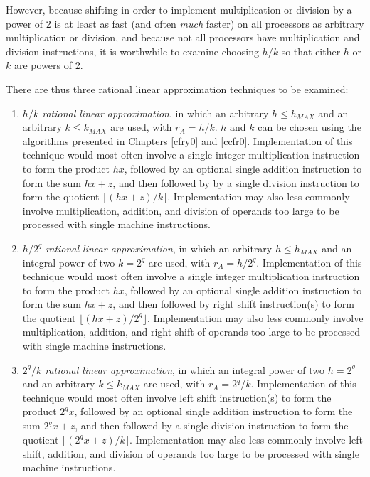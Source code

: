 However, because shifting in order
to implement multiplication or division by a power of 2 
is at least as fast (and often \emph{much} faster)
on all processors as arbitrary multiplication or division, 
and because not all processors have multiplication and division instructions,
it is worthwhile to examine choosing $h/k$ so that either $h$ or $k$ are 
powers of 2.

There are thus three rational linear approximation techniques to be
examined:

\begin{enumerate}
\item \emph{$h/k$ rational linear approximation}, in which an arbitrary
      $h \leq h_{MAX}$ and an arbitrary $k \leq k_{MAX}$ are used,
	  with $r_A = h/k$.  $h$ and $k$ can be chosen using the algorithms
	  presented in Chapters \cfryzeroxrefhyphen\ref{cfry0} and \ccfrzeroxrefhyphen\ref{ccfr0}.
	  Implementation of this technique would most often involve a single integer
	  multiplication instruction to form the product $hx$, followed by an optional single
	  addition instruction to form the sum $hx+z$, and then 
	  followed by by a single division instruction
	  to form the quotient $\lfloor (hx+z)/k \rfloor$.  Implementation may also less commonly involve
	  multiplication, addition, and division of operands too large to be processed
	  with single machine instructions.
\item \emph{$h/2^q$ rational linear approximation}, in which an arbitrary 
      $h \leq h_{MAX}$ and an integral power of two $k=2^q$ are used, with
	  $r_A = h/2^q$.
	  Implementation of this technique would most often involve a single integer
	  multiplication instruction to form the product $hx$, followed by an optional single
	  addition instruction to form the sum $hx+z$, and then 
	  followed by right shift instruction(s)
	  to form the quotient $\lfloor (hx+z)/2^q \rfloor$.  Implementation may also less commonly involve
	  multiplication, addition, and right shift of operands too large to be processed
	  with single machine instructions.
\item \emph{$2^q/k$ rational linear approximation}, in which an integral
      power of two $h=2^q$ and an arbitrary $k \leq k_{MAX}$ are used, with
	  $r_A = 2^q/k$.
	  Implementation of this technique would most often involve left shift
	  instruction(s) to form the product $2^qx$, followed by an optional single
	  addition instruction to form the sum $2^qx+z$, and then 
	  followed by a single division instruction to form 
	  the quotient $\lfloor (2^qx+z)/k \rfloor$.  Implementation may also less 
	  commonly involve
	  left shift, addition, and division of operands too large to be processed
	  with single machine instructions.
\end{enumerate}

